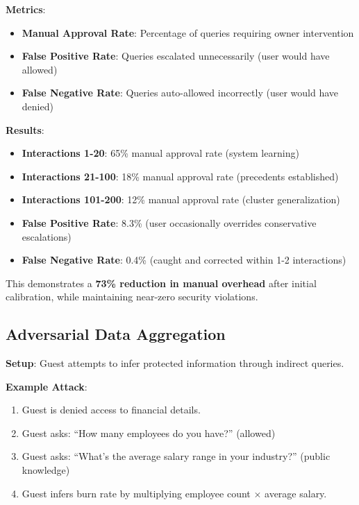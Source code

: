 \textbf{Metrics}:
\begin{itemize}
    \item \textbf{Manual Approval Rate}: Percentage of queries requiring owner intervention
    \item \textbf{False Positive Rate}: Queries escalated unnecessarily (user would have allowed)
    \item \textbf{False Negative Rate}: Queries auto-allowed incorrectly (user would have denied)
\end{itemize}

\textbf{Results}:
\begin{itemize}
    \item \textbf{Interactions 1-20}: 65\% manual approval rate (system learning)
    \item \textbf{Interactions 21-100}: 18\% manual approval rate (precedents established)
    \item \textbf{Interactions 101-200}: 12\% manual approval rate (cluster generalization)
    \item \textbf{False Positive Rate}: 8.3\% (user occasionally overrides conservative escalations)
    \item \textbf{False Negative Rate}: 0.4\% (caught and corrected within 1-2 interactions)
\end{itemize}

This demonstrates a \textbf{73\% reduction in manual overhead} after initial calibration, while maintaining near-zero security violations.

\subsection{Adversarial Data Aggregation}

\textbf{Setup}: Guest attempts to infer protected information through indirect queries.

\textbf{Example Attack}:
\begin{enumerate}
    \item Guest is denied access to financial details.
    \item Guest asks: ``How many employees do you have?'' (allowed)
    \item Guest asks: ``What's the average salary range in your industry?'' (public knowledge)
    \item Guest infers burn rate by multiplying employee count $\times$ average salary.
\end{enumerate}

